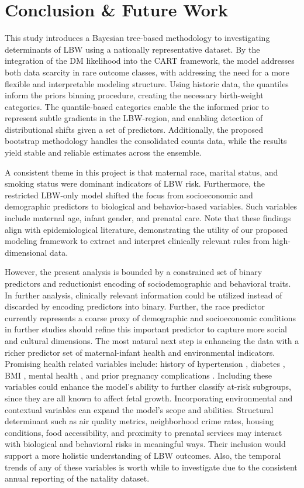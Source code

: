 \chapter{Conclusion \& Future Work}
\label{chap:conclusion}

This study introduces a Bayesian tree-based methodology to investigating determinants of LBW using a nationally representative dataset. By the integration of the DM likelihood into the CART framework, the model addresses both data scarcity in rare outcome classes, with addressing the need for a more flexible and interpretable modeling structure. Using historic data, the quantiles inform the priors binning procedure, creating the necessary birth-weight categories. The quantile-based categories enable the the informed prior to represent subtle gradients in the LBW-region, and enabling detection of distributional shifts given a set of predictors. Additionally, the proposed bootstrap methodology handles the consolidated counts data, while the results yield stable and reliable estimates across the ensemble. 

A consistent theme in this project is that maternal race, marital status, and smoking status were dominant indicators of LBW risk. Furthermore, the restricted LBW-only model shifted the focus from socioeconomic and demographic predictors to biological and behavior-based variables. Such variables include maternal age, infant gender, and prenatal care. Note that these findings align with epidemiological literature, demonstrating the utility of our proposed modeling framework to extract and interpret clinically relevant rules from high-dimensional data. 

However, the present analysis is bounded by a constrained set of binary predictors and reductionist encoding of sociodemographic and behavioral traits. In further analysis, clinically relevant information could be utilized instead of discarded by encoding predictors into binary. Further, the race predictor currently represents a coarse proxy of demographic and socioeconomic conditions in further studies should refine this important predictor to capture more social and cultural dimensions. The most natural next step is enhancing the data with a richer predictor set of maternal-infant health and environmental indicators. Promising health related variables include: history of hypertension \parencite{hypertension_lbw}, diabetes \parencite{diabetes_lbw}, BMI \parencite{bmi_lbw} , mental health \parencite{mental_lbw}, and prior pregnancy complications \parencite{prior_lbw}. Including these variables could enhance the model's ability to further classify at-risk subgroups, since they are all known to affect fetal growth. Incorporating environmental and contextual variables can expand the model's scope and abilities. Structural determinant such as air quality metrics, neighborhood crime rates, housing conditions, food accessibility, and proximity to prenatal services may interact with biological and behavioral risks in meaningful ways. Their inclusion would support a more holistic understanding of LBW outcomes. Also, the temporal trends of any of these variables is worth while to investigate due to the consistent annual reporting of the natality dataset.

